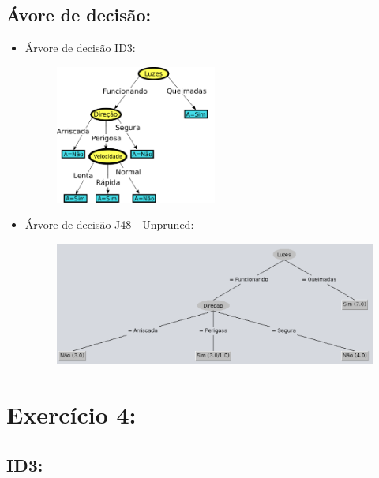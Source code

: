 \documentclass[
    article,            %
    11pt,               %
    oneside,            %
    a4paper,            %
    english,            %
    brazil,             %
    sumario=tradicional,
    ]{abntex2}
\begin{document}
\subsection{\textbf{Ávore de decisão:}}
\begin{itemize}
  \item Árvore de decisão ID3:
  \begin{figure}[H]
    \centering     
    \label{id3-decision-tree-2}
    \includegraphics[width=0.5\textwidth]{imgs/exer3-id3-tree.pdf}
  \end{figure}

  \item Árvore de decisão J48 - Unpruned:
  \begin{figure}[H]
    \centering     
    \label{j48-decision-tree-2}
    \includegraphics[width=\textwidth]{imgs/exer3-j48-tree.pdf}
  \end{figure}
\end{itemize}  

\newpage
\setcounter{section}{4}
\section*{\textbf{Exercício 4:}}

\setcounter{subsection}{0}
\subsection{\textbf{ID3:}}
\end{document}
